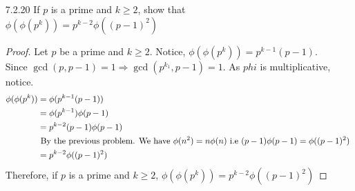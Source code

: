 \documentclass[12pt]{article}
\begin{document}
\begin{enumerate}
\begin{proof}
		\begin{align*}
			\phi(nm) &=
			 p_1^{k_1+j_1}\cdots p_r^{k_r+j_r}q_1^{m_1}\cdots q_s^{m_s} (1-\frac{1}{p_1})\cdots(1-\frac{1}{p_r})(1-\frac{1}{q_1})\cdots (1-\frac{1}{q_s})\\
				&= p_1^{j_1}\cdots
				 p_r^{j_r}(1-\frac{1}{p_1})\cdots(1-\frac{1}{q_1})\cdots(1-\frac{1}{q_s})p_1^{k_1}\cdots p_r^{k_r}\\
				&=\phi(m)\cdot p_1^{k_1}\cdots p_r^{k_r}\\
				&= n \phi(m)
		\end{align*}
		Therefore, If every prime that divides $ n $ also divides $ m $, then $ \phi(nm) = n\phi(m)$
	\end{proof}
	\item[7.2.20] If $ p $ is a prime and $ k\geq2 $, show that $ \phi(\phi(p^k))=p^{k-2}\phi((p-1)^2) $
	\begin{proof}
		Let $ p $ be a prime and $ k\geq 2 $. Notice, $ \phi(\phi(p^k))=p^{k-1}(p-1) $. Since $ \gcd(p,p-1)=1 \Rightarrow \gcd(p^{k_1},p-1)=1 $. As $ phi $ is multiplicative, notice. 
			\begin{align*}
			 	\phi(\phi(p^k)) &= \phi(p^{k-1}(p-1))\\
			 					&= \phi(p^{k-1})\phi(p-1)\\
			 					&= p^{k-2}(p-1)\phi(p-1)\\
			 				&\text{ By the previous problem. We have $ \phi(n^2)=n\phi(n) $ i.e $ (p-1)\phi(p-1) = \phi((p-1)^2) $ }\\
			 					&=p^{k-2}\phi((p-1)^2)
			\end{align*}
			Therefore, if $ p $ is a prime and $ k\geq2 $, $ \phi(\phi(p^k))=p^{k-2}\phi((p-1)^2)$
	\end{proof}
\end{enumerate}
\end{document}
